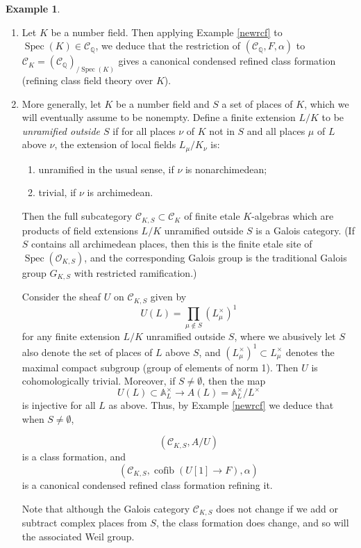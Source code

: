\documentclass[12pt]{article}
\theoremstyle{definition}
\newtheorem{example}[theorem]{Example}
\newcommand{\on}{\operatorname}
\newcommand{\mc}{\mathcal}
\newcommand{\mbb}{\mathbb}
\begin{document}
\begin{example}
\begin{enumerate}
\item Let $K$ be a number field.  Then applying Example \ref{newrcf} to $\on{Spec}(K)\in\mc{C}_{\mbb{Q}}$, we deduce that the restriction of $(\mc{C}_{\mbb{Q}}, F,\alpha)$ to $\mc{C}_K = (\mc{C}_{\mbb{Q}})_{/\on{Spec}(K)}$ gives a canonical condensed refined class formation (refining class field theory over $K$).

\item More generally, let $K$ be a number field and $S$ a set of places of $K$, which we will eventually assume to be nonempty.  Define a finite extension $L/K$ to be \emph{unramified outside $S$} if for all places $\nu$ of $K$ not in $S$ and all places $\mu$ of $L$ above $\nu$, the extension of local fields $L_{\mu}/K_\nu$ is:
\begin{enumerate}
\item unramified in the usual sense, if $\nu$ is nonarchimedean;
\item trivial, if $\nu$ is archimedean.
\end{enumerate}
Then the full subcategory $\mc{C}_{K,S}\subset \mc{C}_K$ of finite etale $K$-algebras which are products of field extensions $L/K$ unramified outside $S$ is a Galois category.  (If $S$ contains all archimedean places, then this is the finite etale site of $\on{Spec}(\mc{O}_{K,S})$, and the corresponding Galois group is the traditional Galois group $G_{K,S}$ with restricted ramification.)

Consider the sheaf $U$ on $\mc{C}_{K,S}$ given by
$$U(L) = \prod_{\mu\not\in S} (L_{\mu}^\times)^1$$
for any finite extension $L/K$ unramified outside $S$, where we abusively let $S$ also denote the set of places of $L$ above $S$, and $(L_{\mu}^\times)^1\subset L_{\mu}^\times$ denotes the maximal compact subgroup (group of elements of norm 1).  Then $U$ is cohomologically trivial.  Moreover, if $S\neq\emptyset$, then the map
$$U(L) \subset \mbb{A}_L^\times\to A(L)=\mbb{A}_L^\times/L^\times$$
is injective for all $L$ as above. Thus, by Example \ref{newrcf} we deduce that when $S\neq \emptyset$,

$$(\mc{C}_{K,S},A/U)$$
is a class formation, and
$$(\mc{C}_{K,S},\on{cofib}(U[1]\to F),\alpha)$$
is a canonical condensed refined class formation refining it.

Note that although the Galois category $\mc{C}_{K,S}$ does not change if we add or subtract complex places from $S$, the class formation does change, and so will the associated Weil group.


\end{enumerate}
\end{example}
\end{document}
